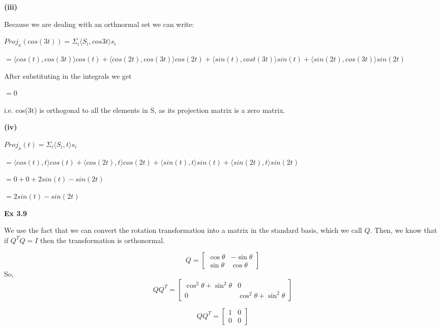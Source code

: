 \documentclass[letterpaper,12pt]{article}
\theoremstyle{definition}
\begin{document}
\begin{spacing}{1.3}{}
	\textbf{(iii)}
	
	\setlength{\leftskip}{20pt}
	
	Because we are dealing with an orthnormal set we can write:
	
	$Proj_{x}(cos(3t)) = \Sigma_{i}\langle S_i , cos{3t} \rangle s_i$
	
	$= \langle cos(t), cos(3t) \rangle cos(t) + \langle cos(2t), cos(3t) \rangle cos(2t) + \langle sin(t), cost(3t) \rangle sin(t) + \langle sin(2t), cos(3t) \rangle sin(2t)$
	
	After substituting in the integrals we get
	
	$=0$
	
	i.e. cos(3t) is orthogonal to all the elements in S, as its projection matrix is a zero matrix.
	
	\setlength{\leftskip}{10pt}
	
	\textbf{(iv)}
	
	\setlength{\leftskip}{20pt}
	
	$Proj_{x}(t) = \Sigma_{i}\langle S_i , t \rangle s_i$
	
	$= \langle cos(t), t \rangle cos(t) + \langle cos(2t), t \rangle cos(2t) + \langle sin(t), t \rangle sin(t) + \langle sin(2t), t \rangle sin(2t)$
	
	$= 0 + 0 + 2sin(t) - sin(2t)$
	
	$=2sin(t) - sin(2t)$
	
	\setlength{\leftskip}{0pt}
	
	\textbf{Ex 3.9}
	
	\setlength{\leftskip}{20pt}
	
	
	We use the fact that we can convert the rotation transformation into a matrix in the standard basis, which we call $Q$. Then, we know that if $Q^TQ = I$ then the transformation is orthonormal.
	
	\[Q=
	\begin{bmatrix}
	\cos \theta & -\sin \theta \\
	\sin \theta & \cos \theta
	\end{bmatrix}
	\]
	So,
	\[Q Q^{T}=
	\begin{bmatrix}
	\cos^{2} \theta + \sin^{2} \theta & 0 \\
	0 & \cos^{2} \theta + \sin^{2} \theta
	\end{bmatrix}
	\]
	
	\[Q Q^{T}=
	\begin{bmatrix}
	1 & 0 \\
	0 & 0
	\end{bmatrix}
	\]
	

\end{spacing}
\end{document}
